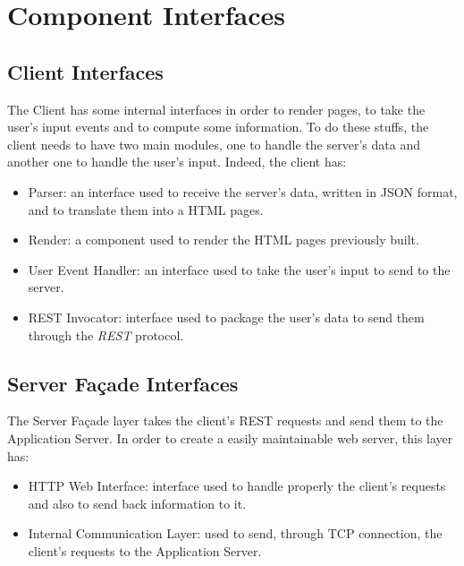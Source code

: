 \section{Component Interfaces}

\subsection*{Client Interfaces}
The Client has some internal interfaces in order to render pages, to take the user's input events and to compute some information.
To do these stuffs, the client needs to have two main modules, one to handle the server's data and another one to handle the user's input. Indeed, the client has:
\begin{itemize}
    \item Parser: an interface used to receive the server's data, written in JSON format, and to translate them into                 a HTML pages.
    \item Render: a component used to render the HTML pages previously built.
    
    \item User Event Handler: an interface used to take the user's input to send to the server.
    \item REST Invocator: interface used to package the user's data to send them through the \emph{REST} protocol.
\end{itemize}

\subsection*{Server Façade Interfaces}
The Server Façade layer takes the client's REST requests and send them to the Application Server. In order to create a easily maintainable web server, this layer has:
\begin{itemize}
    \item HTTP Web Interface: interface used to handle properly the client's requests and also to send back information to it.
    \item Internal Communication Layer: used to send, through TCP connection, the client's requests to the Application Server.
\end{itemize}

